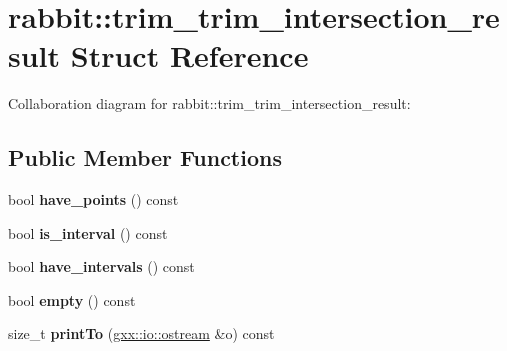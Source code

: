 \hypertarget{structrabbit_1_1trim__trim__intersection__result}{}\section{rabbit\+:\+:trim\+\_\+trim\+\_\+intersection\+\_\+result Struct Reference}
\label{structrabbit_1_1trim__trim__intersection__result}


Collaboration diagram for rabbit\+:\+:trim\+\_\+trim\+\_\+intersection\+\_\+result\+:
\subsection*{Public Member Functions}
\begin{DoxyCompactItemize}
\item 
bool {\bfseries have\+\_\+points} () const \hypertarget{structrabbit_1_1trim__trim__intersection__result_a1bbe6a894bbc57bb4f5388e116aa48cb}{}\label{structrabbit_1_1trim__trim__intersection__result_a1bbe6a894bbc57bb4f5388e116aa48cb}

\item 
bool {\bfseries is\+\_\+interval} () const \hypertarget{structrabbit_1_1trim__trim__intersection__result_a170a05da2323d2afdd7d3146021aa0b0}{}\label{structrabbit_1_1trim__trim__intersection__result_a170a05da2323d2afdd7d3146021aa0b0}

\item 
bool {\bfseries have\+\_\+intervals} () const \hypertarget{structrabbit_1_1trim__trim__intersection__result_a56788d9da54f161a008e0e7a90e71b28}{}\label{structrabbit_1_1trim__trim__intersection__result_a56788d9da54f161a008e0e7a90e71b28}

\item 
bool {\bfseries empty} () const \hypertarget{structrabbit_1_1trim__trim__intersection__result_a3b52638cbd40ec7f1392dd480fe09566}{}\label{structrabbit_1_1trim__trim__intersection__result_a3b52638cbd40ec7f1392dd480fe09566}

\item 
size\+\_\+t {\bfseries print\+To} (\hyperlink{classgxx_1_1io_1_1ostream}{gxx\+::io\+::ostream} \&o) const \hypertarget{structrabbit_1_1trim__trim__intersection__result_aa0745c707ea8b9303b543ae26332f716}{}\label{structrabbit_1_1trim__trim__intersection__result_aa0745c707ea8b9303b543ae26332f716}

\end{DoxyCompactItemize}
